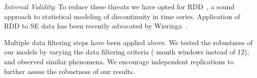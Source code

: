 \smallskip \emph{Internal Validity}: %
To reduce these threats we have opted for RDD~\cite{imbens2008regression}, 
a sound approach to statistical modeling of discontinuity in time series. 
Application of RDD to SE data has been recently advocated 
by Wieringa~\cite{Wieringa}.
 
 
 
Multiple data filtering 
steps have been applied above.
We tested the robustness of our models by varying the data filtering 
criteria ( month windows instead of 12), and observed similar phenomena.
%
We encourage independent replications to further assess the robustness of our results.
 


